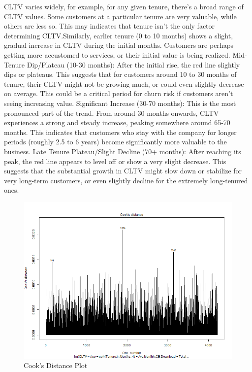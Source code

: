 \documentclass[
]{article}
\begin{document}
CLTV varies widely, for example, for any given tenure, there's a broad
range of CLTV values. Some customers at a particular tenure are very
valuable, while others are less so. This may indicates that tenure isn't
the only factor determining CLTV.Similarly, earlier tenure (0 to 10
months) shows a slight, gradual increase in CLTV during the initial
months. Customers are perhaps getting more accustomed to services, or
their initial value is being realized. Mid-Tenure Dip/Plateau (10-30
months): After the initial rise, the red line slightly dips or plateaus.
This suggests that for customers around 10 to 30 months of tenure, their
CLTV might not be growing much, or could even slightly decrease on
average. This could be a critical period for churn risk if customers
aren't seeing increasing value. Significant Increase (30-70 months):
This is the most pronounced part of the trend. From around 30 months
onwards, CLTV experiences a strong and steady increase, peaking
somewhere around 65-70 months. This indicates that customers who stay
with the company for longer periods (roughly 2.5 to 6 years) become
significantly more valuable to the business. Late Tenure Plateau/Slight
Decline (70+ months): After reaching its peak, the red line appears to
level off or show a very slight decrease. This suggests that the
substantial growth in CLTV might slow down or stabilize for very
long-term customers, or even slightly decline for the extremely
long-tenured ones.

\begin{figure}

{\centering \includegraphics[width=0.8\linewidth]{Plots/cooks_distance} 

}

\caption{Cook's Distance Plot}\label{fig:cooks-distance-img}
\end{figure}
\end{document}
